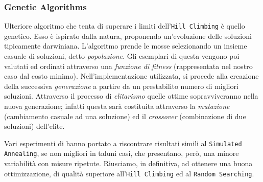			\subsubsection{Genetic Algorithms}
				Ulteriore algoritmo che tenta di superare i limiti dell'\texttt{Hill Climbing} è quello genetico. Esso è ispirato dalla natura, proponendo un'evoluzione delle soluzioni tipicamente darwiniana. L'algoritmo prende le mosse selezionando un insieme casuale di soluzioni, detto \emph{popolazione}. Gli esemplari di questa vengono poi valutati ed ordinati attraverso una \emph{funzione di fitness} (rappresentata nel nostro caso dal costo minimo). Nell'implementazione utilizzata, si procede alla creazione della successiva \emph{generazione} a partire da un prestabilito numero di migliori soluzioni. Attraverso il processo di \emph{elitarismo} quelle ottime sopravviveranno nella nuova generazione; %
				infatti questa sarà costituita attraverso la \emph{mutazione} (cambiamento casuale ad una soluzione) ed il \emph{crossover} (combinazione di due soluzioni) dell'elite.\par
				Vari esperimenti di hanno portato a riscontrare risultati simili  al \texttt{Simulated Annealing}, se non migliori in taluni casi, che presentano, però, una minore variabilità con misure ripetute. Riusciamo, in definitiva, ad ottenere una buona ottimizzazione, di qualità superiore all'\texttt{Hill Climbing} ed al \texttt{Random Searching}.

